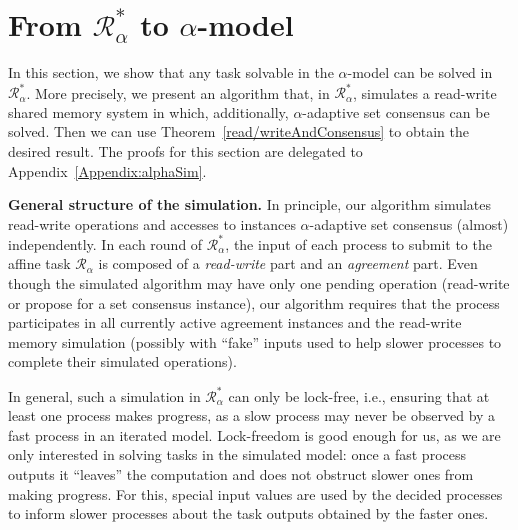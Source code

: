 \documentclass[a4paper]{article}
\newcommand{\myparagraph}[1]{\vspace{6pt}\noindent \textbf{#1}}
\def\R{\ensuremath{\mathcal{R}}}
\begin{document}
\section{From $\R_{\alpha}^*$ to $\alpha$-model}
\label{sec:alpha}

In this section, we show that any task solvable in the $\alpha$-model can be solved in $\R_\alpha^*$.
%
More precisely, we present an algorithm that, in
$\R_\alpha^*$, simulates a read-write shared memory system
in which, additionally, $\alpha$-adaptive set consensus can be solved.
%
Then we can use Theorem~\ref{read/writeAndConsensus} to obtain the desired
result.
%
The proofs for this section are delegated to Appendix~\ref{Appendix:alphaSim}.

\myparagraph{General structure of the simulation.}
In principle, our algorithm simulates read-write operations and
accesses to instances $\alpha$-adaptive set consensus (almost) independently.
%
In each round of $\R_{\alpha}^*$, the input of each process to submit to the affine
task $\R_{\alpha}$ is composed of a \emph{read-write} part and  
an \emph{agreement} part. 
%
Even though the simulated algorithm may have only one pending
operation (read-write or propose for a set consensus instance), our algorithm 
requires that the process participates in all currently active agreement instances
and the read-write memory simulation (possibly with ``fake'' inputs
used to help slower processes to complete their simulated operations). 

In general, such a simulation in $\R_{\alpha}^*$  can only be lock-free,
i.e., ensuring that at least one process makes progress, 
as 
a slow process may never be observed by a fast process in an
iterated model.
Lock-freedom is good enough for us, as we are only interested in solving tasks
in the simulated model: once a fast process outputs it ``leaves'' the
computation and does not obstruct slower ones from making progress.
For this, special input values are  
used by the decided processes to inform slower processes about the task outputs obtained by
the faster ones. 
\end{document}
